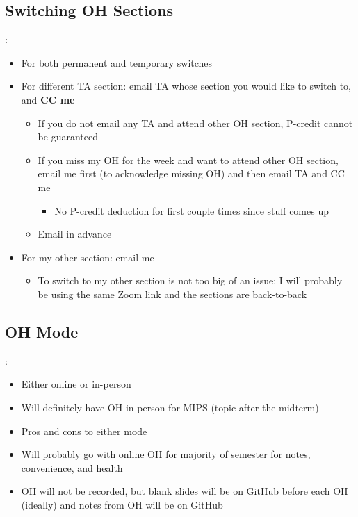 \documentclass{../slides}
\begin{document}
\subsection{Switching OH Sections}
\begin{frame}{\secname: \subsecname}
    \begin{itemize}
        \item For both permanent and temporary switches
        \item For different TA section: email TA whose section you would like to switch to, and \textbf{CC me}
        \begin{itemize}
            \item If you do not email any TA and attend other OH section, P-credit cannot be guaranteed
            \item If you miss my OH for the week and want to attend other OH section, email me first (to acknowledge missing OH) and then email TA and CC me
            \begin{itemize}
                \item No P-credit deduction for first couple times since stuff comes up
            \end{itemize}
            \item Email in advance
        \end{itemize}
        \item For my other section: email me
        \begin{itemize}
            \item To switch to my other section is not too big of an issue; I will probably be using the same Zoom link and the sections are back-to-back
        \end{itemize}
    \end{itemize}
\end{frame}

\subsection{OH Mode}
\begin{frame}{\secname: \subsecname}
    \begin{itemize}
        \item Either online or in-person
        \item Will definitely have OH in-person for MIPS (topic after the midterm)
        \item Pros and cons to either mode
        \item Will probably go with online OH for majority of semester for notes, convenience, and health
        \item OH will not be recorded, but blank slides will be on GitHub before each OH (ideally) and notes from OH will be on GitHub
    \end{itemize}
\end{frame}
\end{document}
